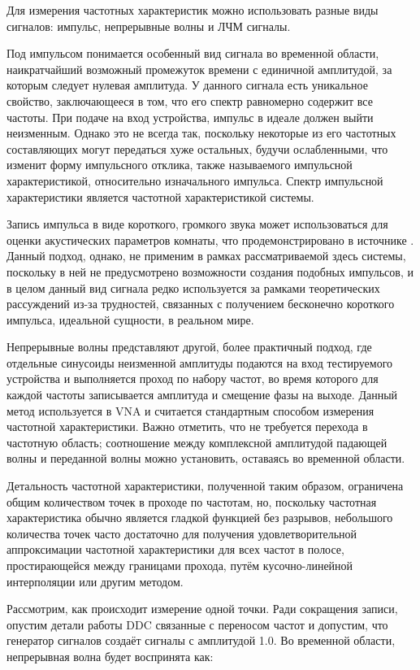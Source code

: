 \documentclass{report}
\begin{document}
Для измерения частотных характеристик можно использовать разные виды сигналов: импульс, непрерывные волны и ЛЧМ сигналы.

Под импульсом понимается особенный вид сигнала во временной области, наикратчайший возможный промежуток времени с единичной амплитудой, за которым следует нулевая амплитуда. У данного сигнала есть уникальное свойство, заключающееся в том, что его спектр равномерно содержит все частоты. При подаче на вход устройства, импульс в идеале должен выйти неизменным. Однако это не всегда так, поскольку некоторые из его частотных составляющих могут передаться хуже остальных, будучи ослабленными, что изменит форму импульсного отклика, также называемого импульсной характеристикой, относительно изначального импульса. Спектр импульсной характеристики является частотной характеристикой системы.

Запись импульса в виде короткого, громкого звука может использоваться для оценки акустических параметров комнаты, что продемонстрировано в источнике \cite{thinkdsp}. Данный подход, однако, не применим в рамках рассматриваемой здесь системы, поскольку в ней не предусмотрено возможности создания подобных импульсов, и в целом данный вид сигнала редко используется за рамками теоретических рассуждений из-за трудностей, связанных с получением бесконечно короткого импульса, идеальной сущности, в реальном мире.

Непрерывные волны представляют другой, более практичный подход, где отдельные синусоиды неизменной амплитуды подаются на вход тестируемого устройства и выполняется проход по набору частот, во время которого для каждой частоты записывается амплитуда и смещение фазы на выходе. Данный метод используется в VNA и считается стандартным способом измерения частотной характеристики. Важно отметить, что не требуется перехода в частотную область; соотношение между комплексной амплитудой падающей волны и переданной волны можно установить, оставаясь во временной области.

Детальность частотной характеристики, полученной таким образом, ограничена общим количеством точек в проходе по частотам, но, поскольку частотная характеристика обычно является гладкой функцией без разрывов, небольшого количества точек часто достаточно для получения удовлетворительной аппроксимации частотной характеристики для всех частот в полосе, простирающейся между границами прохода, путём кусочно-линейной интерполяции или другим методом.

Рассмотрим, как происходит измерение одной точки. Ради сокращения записи, опустим  детали работы DDC связанные с переносом частот и допустим, что генератор сигналов создаёт сигналы с амплитудой 1.0. Во временной области, непрерывная волна будет воспринята как:
\end{document}
